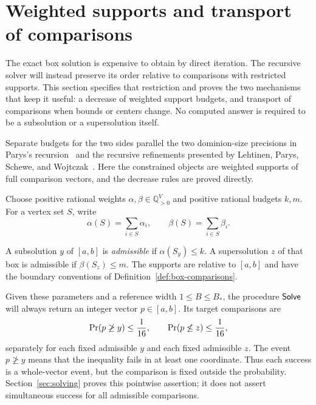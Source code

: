 \section{Weighted supports and transport of comparisons}
\label{sec:budgets}

The exact box solution is expensive to obtain by direct iteration. The
recursive solver will instead preserve its order relative to comparisons
with restricted supports. This section specifies that restriction and
proves the two mechanisms that keep it useful: a decrease of weighted
support budgets, and transport of comparisons when bounds or centers
change. No computed answer is required to be a subsolution or a
supersolution itself.

Separate budgets for the two sides parallel the two dominion-size
precisions in Parys's recursion~\cite[Algorithm~2]{Parys2019} and the
recursive refinements presented by Lehtinen, Parys, Schewe, and
Wojtczak~\cite[Sections~3--4]{LehtinenParysScheweWojtczak2022}.
Here the constrained objects are weighted supports of full comparison
vectors, and the decrease rules are proved directly.

Choose positive rational weights
$\alpha,\beta\in\mathbb Q_{>0}^V$ and positive rational budgets $k,m$.
For a vertex set $S$, write
\[
 \alpha(S)=\sum_{i\in S}\alpha_i,\qquad
 \beta(S)=\sum_{i\in S}\beta_i.
\]
\begin{definition}\label{def:admissible-comparison}
A subsolution $y$ of $[a,b]$ is \emph{admissible} if
$\alpha(S_y)\le k$. A supersolution $z$ of that box is admissible if
$\beta(S_z)\le m$. The supports are relative to $[a,b]$ and have the
boundary conventions of Definition~\ref{def:box-comparisons}.
\end{definition}

Given these parameters and a reference width $1\le B\le B_*$, the
procedure $\mathsf{Solve}$ will always return an integer vector $p\in[a,b]$.
Its target comparisons are
\begin{equation}\label{eq:comparison-guarantees}
 \operatorname{Pr}(p\not\ge y)\le\frac1{16},\qquad
 \operatorname{Pr}(p\not\le z)\le\frac1{16},
\end{equation}
separately for each fixed admissible $y$ and each fixed admissible $z$.
The event $p\not\ge y$ means that the inequality fails in at least one
coordinate. Thus each success is a whole-vector event, but the comparison
is fixed outside the probability. Section~\ref{sec:solving} proves this
pointwise assertion; it does not assert simultaneous success for all
admissible comparisons.

